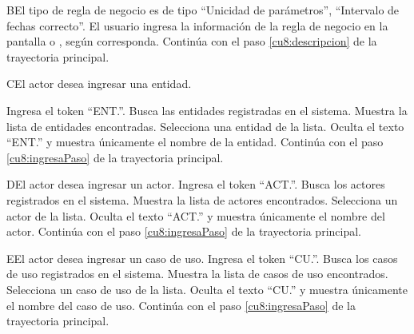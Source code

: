  \begin{UCtrayectoriaA}{B}{El tipo de regla de negocio es de tipo ``Unicidad de parámetros'', ``Intervalo de fechas correcto''.}
	\UCpaso[\UCactor] El usuario ingresa la información de la regla de negocio en la pantalla  o
	, según corresponda.
	\UCpaso[] Continúa con el paso \ref{cu8:descripcion} de la trayectoria principal.
 \end{UCtrayectoriaA}

 \begin{UCtrayectoriaA}{C}{El actor desea ingresar una entidad.}
 	
 	 \UCpaso[\UCactor] Ingresa el token ``ENT.''.
 	\UCpaso[\UCsist] Busca las entidades registradas en el sistema. 
 	\UCpaso[\UCsist] Muestra la lista de entidades encontradas.
 	\UCpaso[\UCactor] Selecciona una entidad de la lista.
  	\UCpaso[\UCsist] Oculta el texto ``ENT.'' y muestra únicamente el nombre de la entidad.
    \UCpaso[] Continúa con el paso \ref{cu8:ingresaPaso} de la trayectoria principal.
 \end{UCtrayectoriaA}
 
 \begin{UCtrayectoriaA}{D}{El actor desea ingresar un actor.}
 	\UCpaso[\UCactor] Ingresa el token ``ACT.''.
 	\UCpaso[\UCsist] Busca los actores registrados en el sistema. 
 	\UCpaso[\UCsist] Muestra la lista de actores encontrados.
 	\UCpaso[\UCactor] Selecciona un actor de la lista.
  	\UCpaso[\UCsist] Oculta el texto ``ACT.'' y muestra únicamente el nombre del actor.
    \UCpaso[] Continúa con el paso \ref{cu8:ingresaPaso} de la trayectoria principal.
 \end{UCtrayectoriaA}

 \begin{UCtrayectoriaA}{E}{El actor desea ingresar un caso de uso.}
  	\UCpaso[\UCactor] Ingresa el token ``CU.''.	
 	\UCpaso[\UCsist] Busca los casos de uso registrados en el sistema. 
 	\UCpaso[\UCsist] Muestra la lista de casos de uso encontrados.
 	\UCpaso[\UCactor] Selecciona un caso de uso de la lista.
  	\UCpaso[\UCsist] Oculta el texto ``CU.'' y muestra únicamente el nombre del caso de uso.
    \UCpaso[] Continúa con el paso \ref{cu8:ingresaPaso} de la trayectoria principal.
 \end{UCtrayectoriaA}

